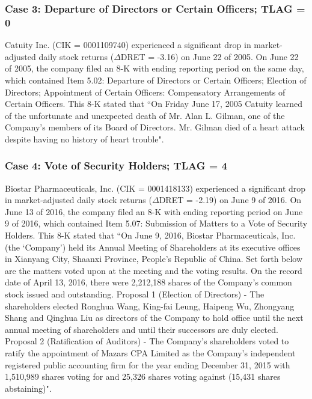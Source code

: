 \subsubsection*{Case 3: Departure of Directors or Certain Officers; TLAG = 0}
Catuity Inc. (CIK = 0001109740) experienced a significant drop in market-adjusted daily stock returns ($\Delta$DRET = -3.16) on June 22 of 2005. On June 22 of 2005, the company filed an 8-K with ending reporting period on the same day, which contained Item 5.02: Departure of Directors or Certain Officers; Election of Directors; Appointment of Certain Officers: Compensatory Arrangements of Certain Officers. This 8-K stated that ``On Friday June 17, 2005 Catuity learned of the unfortunate and unexpected death of Mr. Alan L. Gilman, one of the Company's members of its Board of Directors. Mr. Gilman died of a heart attack despite having no history of heart trouble". 
\subsubsection*{Case 4: Vote of Security Holders; TLAG = 4}
Biostar Pharmaceuticals, Inc. (CIK = 0001418133) experienced a significant drop in market-adjusted daily stock returns ($\Delta$DRET = -2.19) on June 9 of 2016. On June 13 of 2016, the company filed an 8-K with ending reporting period on June 9 of 2016, which contained Item 5.07: Submission of Matters to a Vote of Security Holders. This 8-K stated that ``On June 9, 2016, Biostar Pharmaceuticals, Inc. (the `Company') held its Annual Meeting of Shareholders at its executive offices in Xianyang City, Shaanxi Province, People's Republic of China. Set forth below are the matters voted upon at the meeting and the voting results. On the record date of April 13, 2016, there were 2,212,188 shares of the Company's common stock issued and outstanding. Proposal 1 (Election of Directors) - The shareholders elected Ronghua Wang, King-fai Leung, Haipeng Wu, Zhongyang Shang and Qinghua Liu as directors of the Company to hold office until the next annual meeting of shareholders and until their successors are duly elected. Proposal 2 (Ratification of Auditors) - The Company's shareholders voted to ratify the appointment of Mazars CPA Limited as the Company's independent registered public accounting firm for the year ending December 31, 2015 with 1,510,989 shares voting for and 25,326 shares voting against (15,431 shares abstaining)".
